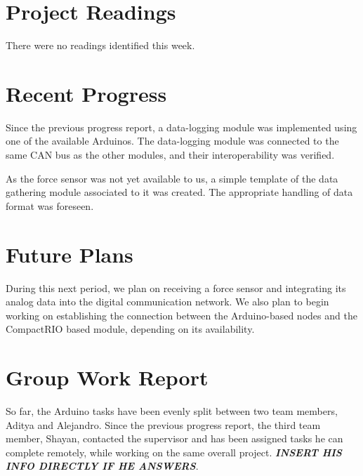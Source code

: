 \documentclass[12pt]{article}
\begin{document}
\section*{Project Readings}
There were no readings identified this week.

\section*{Recent Progress}
Since the previous progress report, a data-logging module was implemented
using one of the available Arduinos. The data-logging module was connected to
the same CAN bus as the other modules, and their interoperability was verified.

As the force sensor was not yet available to us, a simple template of the data
gathering module associated to it was created. The appropriate handling of
data format was foreseen.

\section*{Future Plans}
During this next period, we plan on receiving a force sensor and integrating
its analog data into the digital communication network. We also plan to begin
working on establishing the connection between the Arduino-based nodes and 
the CompactRIO based module, depending on its availability.

\section*{Group Work Report}
So far, the Arduino tasks have been evenly split between two team members, 
Aditya and Alejandro. Since the previous progress report, the third team member,
Shayan, contacted the supervisor and has been assigned tasks he can complete 
remotely, while working on the same overall project. \textbf{\textit{INSERT
HIS INFO DIRECTLY IF HE ANSWERS}}.
\end{document}
